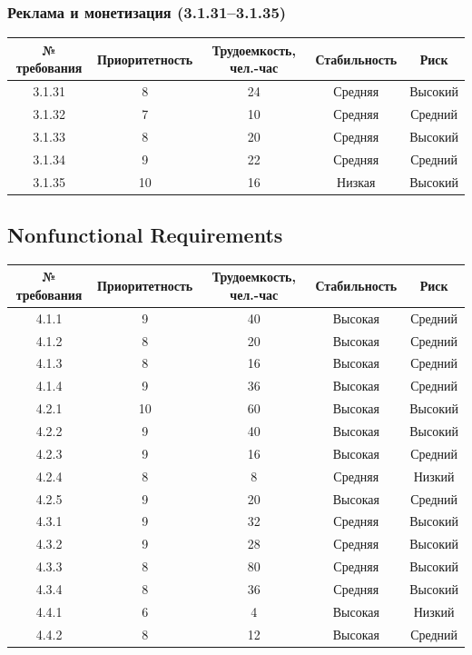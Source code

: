 \subsubsection*{Реклама и монетизация (3.1.31--3.1.35)}
\begin{center}
\renewcommand{\arraystretch}{1.4}
\begin{tabular}{|c|c|c|c|c|}
\hline
№ требования & Приоритетность & Трудоемкость, чел.-час & Стабильность & Риск \\ \hline
3.1.31 & 8 & 24 & Средняя & Высокий \\ \hline
3.1.32 & 7 & 10 & Средняя & Средний \\ \hline
3.1.33 & 8 & 20 & Средняя & Высокий \\ \hline
3.1.34 & 9 & 22 & Средняя & Средний \\ \hline
3.1.35 & 10 & 16 & Низкая & Высокий \\ \hline
\end{tabular}
\renewcommand{\arraystretch}{1}
\end{center}

\subsection{Nonfunctional Requirements}
\begin{center}
\renewcommand{\arraystretch}{1.5}
\begin{tabular}{|c|c|c|c|c|}
\hline
№ требования & Приоритетность & Трудоемкость, чел.-час & Стабильность & Риск \\ \hline
4.1.1 & 9 & 40 & Высокая & Средний \\ \hline
4.1.2 & 8 & 20 & Высокая & Средний \\ \hline
4.1.3 & 8 & 16 & Высокая & Средний \\ \hline
4.1.4 & 9 & 36 & Высокая & Средний \\ \hline
4.2.1 & 10 & 60 & Высокая & Высокий \\ \hline
4.2.2 & 9 & 40 & Высокая & Высокий \\ \hline
4.2.3 & 9 & 16 & Высокая & Средний \\ \hline
4.2.4 & 8 & 8 & Средняя & Низкий \\ \hline
4.2.5 & 9 & 20 & Высокая & Средний \\ \hline
4.3.1 & 9 & 32 & Средняя & Высокий \\ \hline
4.3.2 & 9 & 28 & Средняя & Высокий \\ \hline
4.3.3 & 8 & 80 & Средняя & Высокий \\ \hline
4.3.4 & 8 & 36 & Средняя & Высокий \\ \hline
4.4.1 & 6 & 4 & Высокая & Низкий \\ \hline
4.4.2 & 8 & 12 & Высокая & Средний \\ \hline
\end{tabular}
\renewcommand{\arraystretch}{1}
\end{center}

